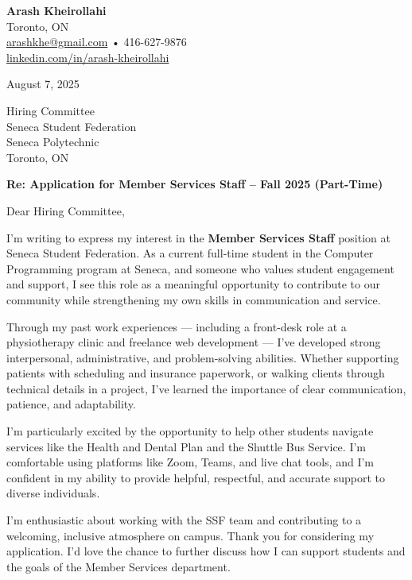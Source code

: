 \documentclass[letterpaper,11pt]{article}
\begin{document}

{\Large \textbf{Arash Kheirollahi}}\\
Toronto, ON \\
\href{mailto:arashkhe@gmail.com}{arashkhe@gmail.com} • 416-627-9876 \\
\href{https://linkedin.com/in/arash-kheirollahi}{linkedin.com/in/arash-kheirollahi}

\vspace{1em}

August 7, 2025

Hiring Committee \\
Seneca Student Federation \\
Seneca Polytechnic \\
Toronto, ON

\textbf{Re: Application for Member Services Staff – Fall 2025 (Part-Time)}

Dear Hiring Committee,

I'm writing to express my interest in the \textbf{Member Services Staff} position at Seneca Student Federation. As a current full-time student in the Computer Programming program at Seneca, and someone who values student engagement and support, I see this role as a meaningful opportunity to contribute to our community while strengthening my own skills in communication and service.

Through my past work experiences — including a front-desk role at a physiotherapy clinic and freelance web development — I’ve developed strong interpersonal, administrative, and problem-solving abilities. Whether supporting patients with scheduling and insurance paperwork, or walking clients through technical details in a project, I’ve learned the importance of clear communication, patience, and adaptability.

I’m particularly excited by the opportunity to help other students navigate services like the Health and Dental Plan and the Shuttle Bus Service. I’m comfortable using platforms like Zoom, Teams, and live chat tools, and I’m confident in my ability to provide helpful, respectful, and accurate support to diverse individuals.

I'm enthusiastic about working with the SSF team and contributing to a welcoming, inclusive atmosphere on campus. Thank you for considering my application. I’d love the chance to further discuss how I can support students and the goals of the Member Services department.
\end{document}
